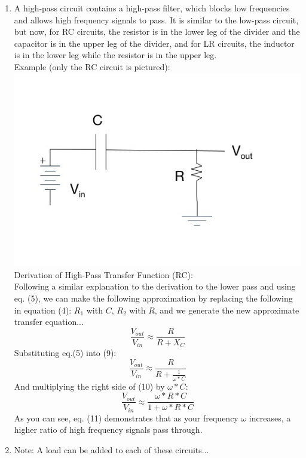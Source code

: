 \documentclass{article}
\begin{document}
\begin{enumerate}
\begin{enumerate}
        \item A high-pass circuit contains a high-pass filter, which blocks low frequencies and allows high frequency signals to pass. It is similar to the low-pass circuit, but now, for RC circuits, the resistor is in the lower leg of the divider and the capacitor is in the upper leg of the divider, and for LR circuits, the inductor is in the lower leg while the resistor is in the upper leg.\\
        Example (only the RC circuit is pictured):\\
        \includegraphics[scale=0.5]{highpass.jpg} \\
        Derivation of High-Pass Transfer Function (RC): \\
        Following a similar explanation to the derivation to the lower pass and using eq. (5), we can make the following approximation by replacing the following in equation (4): $R_1$ with $C$, $R_2$ with $R$, and we generate the new approximate transfer equation...
        \begin{equation}
            \frac{V_{out}}{V_{in}} \approx \frac{R}{R + X_C}
        \end{equation}
        Substituting eq.(5) into (9): \\
        \begin{equation}
            \frac{V_{out}}{V_{in}} \approx \frac{R}{R+\frac{1}{\omega*C}}
        \end{equation}
        And multiplying the right side of (10) by $\omega*C$: \\
        \begin{equation}
            \frac{V_{out}}{V_{in}} \approx \frac{\omega*R*C}{1+\omega*R*C}
        \end{equation}
        As you can see, eq. (11) demonstrates that as your frequency $\omega$ increases, a higher ratio of high frequency signals pass through.
        
        \item Note: A load can be added to each of these circuits...
    \end{enumerate}
\end{enumerate}
\end{document}
